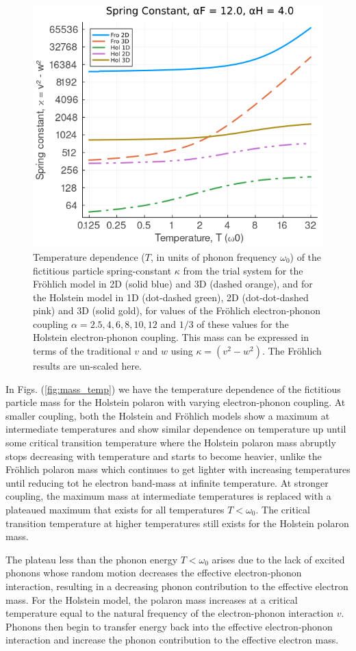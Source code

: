 \begin{figure}[!tbp]
    \includegraphics[width=.49\textwidth]{figures/spring_temp_12_4.png}
    \caption{Temperature dependence ($T$, in units of phonon frequency $\omega_0$) of the fictitious particle spring-constant $\kappa$ from the trial system for the Fr\"ohlich model in 2D (solid blue) and 3D (dashed orange), and for the Holstein model in 1D (dot-dashed green), 2D (dot-dot-dashed pink) and 3D (solid gold), for values of the Fr\"ohlich electron-phonon coupling $\alpha = 2.5, 4, 6, 8, 10, 12$ and $1/3$ of these values for the Holstein electron-phonon coupling. This mass can be expressed in terms of the traditional $v$ and $w$ using $\kappa = (v^2 - w^2)$. The Fr\"ohlich results are un-scaled here.}
    \label{fig:spring_temp}
\end{figure}

In Figs. (\ref{fig:mass_temp}) we have the temperature dependence of the fictitious particle mass for the Holstein polaron with varying electron-phonon coupling. At smaller coupling, both the Holstein and Fr\"ohlich models show a maximum at intermediate temperatures and show similar dependence on temperature up until some critical transition temperature where the Holstein polaron mass abruptly stops decreasing with temperature and starts to become heavier, unlike the Fr\"ohlich polaron mass which continues to get lighter with increasing temperatures until reducing tot he electron band-mass at infinite temperature. At stronger coupling, the maximum mass at intermediate temperatures is replaced with a plateaued maximum that exists for all temperatures $T < \omega_0$. The critical transition temperature at higher temperatures still exists for the Holstein polaron mass.

The plateau less than the phonon energy $T < \omega_0$ arises due to the lack of excited phonons whose random motion decreases the effective electron-phonon interaction, resulting in a decreasing phonon contribution to the effective electron mass. For the Holstein model, the polaron mass increases at a critical temperature equal to the natural frequency of the electron-phonon interaction $v$. Phonons then begin to transfer energy back into the effective electron-phonon interaction and increase the phonon contribution to the effective electron mass.

